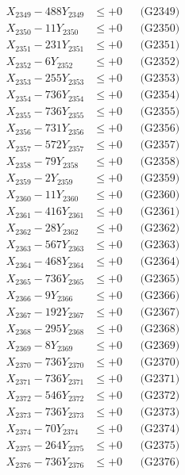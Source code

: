 \documentclass[a4paper,10pt]{article}
\begin{document}
{\begin{align}
X_{2349} - 488Y_{2349} &\leq +0 && \text{(G2349)} \\
X_{2350} - 11Y_{2350} &\leq +0 && \text{(G2350)} \\
\allowbreak
X_{2351} - 231Y_{2351} &\leq +0 && \text{(G2351)} \\
X_{2352} - 6Y_{2352} &\leq +0 && \text{(G2352)} \\
X_{2353} - 255Y_{2353} &\leq +0 && \text{(G2353)} \\
X_{2354} - 736Y_{2354} &\leq +0 && \text{(G2354)} \\
X_{2355} - 736Y_{2355} &\leq +0 && \text{(G2355)} \\
X_{2356} - 731Y_{2356} &\leq +0 && \text{(G2356)} \\
X_{2357} - 572Y_{2357} &\leq +0 && \text{(G2357)} \\
X_{2358} - 79Y_{2358} &\leq +0 && \text{(G2358)} \\
X_{2359} - 2Y_{2359} &\leq +0 && \text{(G2359)} \\
X_{2360} - 11Y_{2360} &\leq +0 && \text{(G2360)} \\
\allowbreak
X_{2361} - 416Y_{2361} &\leq +0 && \text{(G2361)} \\
X_{2362} - 28Y_{2362} &\leq +0 && \text{(G2362)} \\
X_{2363} - 567Y_{2363} &\leq +0 && \text{(G2363)} \\
X_{2364} - 468Y_{2364} &\leq +0 && \text{(G2364)} \\
X_{2365} - 736Y_{2365} &\leq +0 && \text{(G2365)} \\
X_{2366} - 9Y_{2366} &\leq +0 && \text{(G2366)} \\
X_{2367} - 192Y_{2367} &\leq +0 && \text{(G2367)} \\
X_{2368} - 295Y_{2368} &\leq +0 && \text{(G2368)} \\
X_{2369} - 8Y_{2369} &\leq +0 && \text{(G2369)} \\
X_{2370} - 736Y_{2370} &\leq +0 && \text{(G2370)} \\
\allowbreak
X_{2371} - 736Y_{2371} &\leq +0 && \text{(G2371)} \\
X_{2372} - 546Y_{2372} &\leq +0 && \text{(G2372)} \\
X_{2373} - 736Y_{2373} &\leq +0 && \text{(G2373)} \\
X_{2374} - 70Y_{2374} &\leq +0 && \text{(G2374)} \\
X_{2375} - 264Y_{2375} &\leq +0 && \text{(G2375)} \\
X_{2376} - 736Y_{2376} &\leq +0 && \text{(G2376)} \\

\end{align}}
\end{document}
